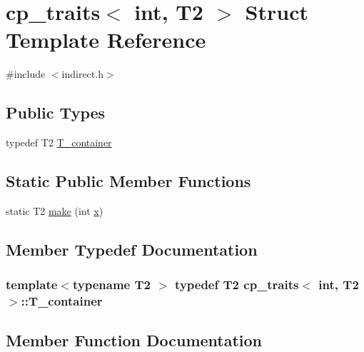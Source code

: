 \hypertarget{structcp__traits_3_01int_00_01T2_01_4}{}\section{cp\+\_\+traits$<$ int, T2 $>$ Struct Template Reference}
\label{structcp__traits_3_01int_00_01T2_01_4}


{\ttfamily \#include $<$indirect.\+h$>$}

\subsection*{Public Types}
\begin{DoxyCompactItemize}
\item 
typedef T2 \hyperlink{structcp__traits_3_01int_00_01T2_01_4_a11d31a57335e35c09fec7274450ebaae}{T\+\_\+container}
\end{DoxyCompactItemize}
\subsection*{Static Public Member Functions}
\begin{DoxyCompactItemize}
\item 
static T2 \hyperlink{structcp__traits_3_01int_00_01T2_01_4_aa3a46529b6f65d2a2d39cdf855d4d818}{make} (int \hyperlink{vecnorm1_8cc_ac73eed9e41ec09d58f112f06c2d6cb63}{x})
\end{DoxyCompactItemize}


\subsection{Member Typedef Documentation}
\hypertarget{structcp__traits_3_01int_00_01T2_01_4_a11d31a57335e35c09fec7274450ebaae}{}
\subsubsection[{T\+\_\+container}]{\setlength{\rightskip}{0pt plus 5cm}template$<$typename T2 $>$ typedef T2 {\bf cp\+\_\+traits}$<$ int, T2 $>$\+::{\bf T\+\_\+container}}\label{structcp__traits_3_01int_00_01T2_01_4_a11d31a57335e35c09fec7274450ebaae}


\subsection{Member Function Documentation}
\hypertarget{structcp__traits_3_01int_00_01T2_01_4_aa3a46529b6f65d2a2d39cdf855d4d818}{}
